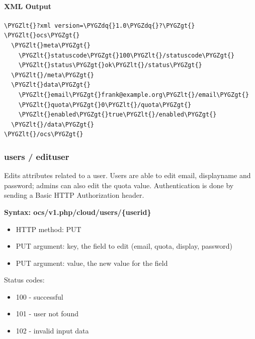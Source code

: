 \documentclass[letterpaper,10pt,english]{sphinxmanual}
\def\PYGZlt{\char`\<}
\def\PYGZgt{\char`\>}
\def\PYGZdq{\char`\"}
\begin{document}
\paragraph{XML Output}
\label{configuration_user/user_provisioning_api:id4}
\begin{Verbatim}[commandchars=\\\{\}]
\PYGZlt{}?xml version=\PYGZdq{}1.0\PYGZdq{}?\PYGZgt{}
\PYGZlt{}ocs\PYGZgt{}
  \PYGZlt{}meta\PYGZgt{}
    \PYGZlt{}statuscode\PYGZgt{}100\PYGZlt{}/statuscode\PYGZgt{}
    \PYGZlt{}status\PYGZgt{}ok\PYGZlt{}/status\PYGZgt{}
  \PYGZlt{}/meta\PYGZgt{}
  \PYGZlt{}data\PYGZgt{}
    \PYGZlt{}email\PYGZgt{}frank@example.org\PYGZlt{}/email\PYGZgt{}
    \PYGZlt{}quota\PYGZgt{}0\PYGZlt{}/quota\PYGZgt{}
    \PYGZlt{}enabled\PYGZgt{}true\PYGZlt{}/enabled\PYGZgt{}
  \PYGZlt{}/data\PYGZgt{}
\PYGZlt{}/ocs\PYGZgt{}
\end{Verbatim}


\subsubsection{\textbf{users / edituser}}
\label{configuration_user/user_provisioning_api:users-edituser}
Edits attributes related to a user. Users are able to edit email, displayname
and password; admins can also edit the quota value. Authentication is done by
sending a Basic HTTP Authorization header.

\textbf{Syntax: ocs/v1.php/cloud/users/\{userid\}}
\begin{itemize}
\item {} 
HTTP method: PUT

\item {} 
PUT argument: key, the field to edit (email, quota, display, password)

\item {} 
PUT argument: value, the new value for the field

\end{itemize}

Status codes:
\begin{itemize}
\item {} 
100 - successful

\item {} 
101 - user not found

\item {} 
102 - invalid input data

\end{itemize}
\end{document}
